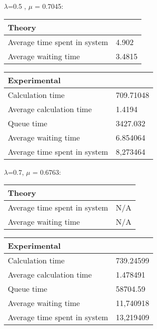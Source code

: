 \begin{minipage}{\linewidth}
   $\lambda$=0.5 , $\mu$ = 0.7045:

    \bigskip
    \begin{minipage}{0.45\linewidth}
        \begin{tabular}{|l|l|}
            \hline
            Theory & \\
            \hline
            Average time spent in system & 4.902 \\
            Average waiting time & 3.4815 \\
            \hline
        \end{tabular}
    \end{minipage}
    \begin{minipage}{0.45\linewidth}
        \begin{tabular}{|l|l|}
            \hline
            Experimental & \\
            \hline
            Calculation time & 709.71048 \\
            Average calculation time & 1.4194 \\
            Queue time & 3427.032 \\
            Average waiting time & 6.854064 \\
            Average time spent in system & 8,273464 \\
            \hline
        \end{tabular}
    \end{minipage}
    \bigskip
\end{minipage}

\begin{minipage}{\linewidth}
   $\lambda$=0.7, $\mu$ = 0.6763:

    \bigskip
    \begin{minipage}{0.45\linewidth}
        \begin{tabular}{|l|l|}
            \hline
            Theory & \\
            \hline
            Average time spent in system & N/A \\
            Average waiting time & N/A \\
            \hline
        \end{tabular}
    \end{minipage}
    \begin{minipage}{0.45\linewidth}
        \begin{tabular}{|l|l|}
            \hline
            Experimental & \\
            \hline
            Calculation time & 739.24599 \\
            Average calculation time & 1.478491 \\
            Queue time & 58704.59 \\
            Average waiting time & 11,740918 \\
            Average time spent in system & 13,219409 \\
            \hline
        \end{tabular}
    \end{minipage}
    \bigskip
\end{minipage}

